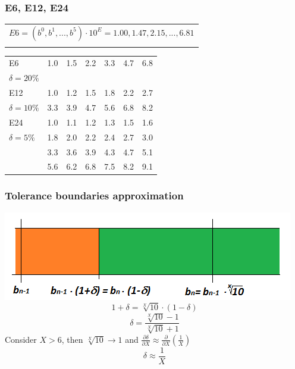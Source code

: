 \documentclass{beamer}
\begin{document}
	\begin{frame}
    \frametitle{E6, E12, E24}
		\begin{center}
		\begin{tabular}{c}
		$E6 = (b^0, b^1,...,b^5)\cdot 10^E = 1.00, 1.47, 2.15,...,6.81$\\\\
		\end{tabular}

		\begin{tabular}{|l |c c c c c c|}
			\hline
			E6 &1.0 &1.5 &2.2 &3.3 &4.7 &6.8\\
			$\delta = 20\%$ &&&&&&\\
			\hline
			E12 &1.0 &1.2 &1.5 &1.8 &2.2 &2.7\\
			$\delta = 10\%$&3.3 &3.9 &4.7 &5.6 &6.8 &8.2\\
			\hline
			E24 &1.0 &1.1 &1.2 &1.3 &1.5 &1.6\\
			$\delta = 5\%$	&1.8 &2.0 &2.2 &2.4 &2.7 &3.0\\ 
					&3.3 &3.6 &3.9 &4.3 &4.7 &5.1\\
					&5.6 &6.2 &6.8 &7.5 &8.2 &9.1\\
			\hline
		\end{tabular}
		\end{center}
  \end{frame}
	\begin{frame}
    \frametitle{Tolerance boundaries approximation}
		\begin{center}
		\includegraphics[scale=0.65]{obr02_tolerancniPasma.png}
		$$1+\delta = \sqrt[X]{10}\cdot (1-\delta)$$
		$$\delta = \frac{\sqrt[X]{10} - 1}{\sqrt[X]{10} + 1}$$
		Consider $X > 6$, then $\sqrt[X]{10} \rightarrow 1$ and $\frac{\partial\delta}{\partial X} \approx \frac{\partial}{\partial X}\left(\frac{1}{X}\right)$
		$$\delta \approx \frac{1}{X}$$
		
		\end{center}
  \end{frame}
\end{document}

